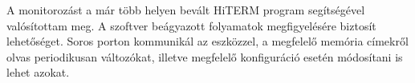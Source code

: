 A monitorozást a már több helyen bevált HiTERM program segítségével valósítottam meg. A szoftver beágyazott folyamatok megfigyelésére biztosít lehetőséget. Soros porton kommunikál az eszközzel, a megfelelő memória címekről olvas periodikusan változókat, illetve megfelelő konfiguráció esetén módosítani is lehet azokat.
